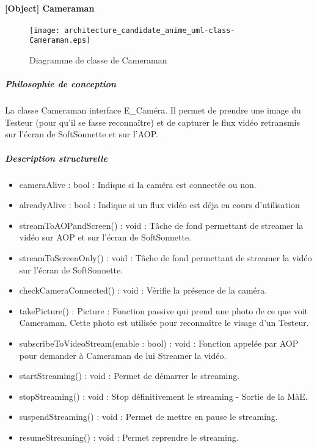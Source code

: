     \paragraph{[Object] Cameraman}%
    \begin{figure} [H]
        \centering
        \texttt{[image: architecture\_candidate\_anime\_uml-class-Cameraman.eps]}
        \caption{Diagramme de classe de Cameraman}
        \label{Classe-Cameraman}
    \end{figure}
        \subparagraph{Philosophie de conception}%
        La classe Cameraman interface E\_Caméra.
        Il permet de prendre une image du Testeur (pour qu’il se fasse reconnaître) et de capturer le flux vidéo retransmis sur l’écran de SoftSonnette et sur l’AOP.
        \subparagraph{Description structurelle}%
            \begin{itemize}
                \item {cameraAlive : bool : Indique si la caméra est connectée ou non.}
                \item {alreadyAlive : bool : Indique si un flux vidéo est déja en cours d'utilisation}
            \end{itemize}
            \begin{itemize}
                \item {streamToAOPandScreen() : void : Tâche de fond permettant de streamer la vidéo sur AOP et sur l'écran de SoftSonnette.}
                \item {streamToScreenOnly() : void : Tâche de fond permettant de streamer la vidéo sur l'écran de SoftSonnette.}
                \item {checkCameraConnected() : void : Vérifie la présence de la caméra.}
                \item {takePicture() : Picture : Fonction passive qui prend une photo de ce que voit Cameraman. 
                Cette photo est utilisée pour reconnaître le visage d’un Testeur.}
                \item {subscribeToVideoStream(enable : bool) : void : Fonction appelée par AOP pour demander à Cameraman de lui Streamer la vidéo.}
                \item {startStreaming() : void : Permet de démarrer le streaming.}
                \item {stopStreaming() : void : Stop définitivement le streaming - Sortie de la MàE.}
                \item {suspendStreaming() : void : Permet de mettre en pause le streaming.}
                \item {resumeStreaming() : void : Permet reprendre le streaming.}
            \end{itemize}
